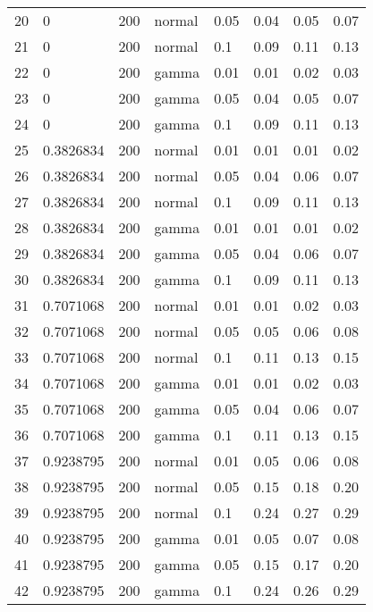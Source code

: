 \begin{table}[ht]
\begin{tabular}{rllllrrr}
  20 & 0 & 200 & normal & 0.05 & 0.04 & 0.05 & 0.07 \\ 
  21 & 0 & 200 & normal & 0.1 & 0.09 & 0.11 & 0.13 \\ 
  22 & 0 & 200 & gamma & 0.01 & 0.01 & 0.02 & 0.03 \\ 
  23 & 0 & 200 & gamma & 0.05 & 0.04 & 0.05 & 0.07 \\ 
  24 & 0 & 200 & gamma & 0.1 & 0.09 & 0.11 & 0.13 \\ 
  25 & 0.3826834 & 200 & normal & 0.01 & 0.01 & 0.01 & 0.02 \\ 
  26 & 0.3826834 & 200 & normal & 0.05 & 0.04 & 0.06 & 0.07 \\ 
  27 & 0.3826834 & 200 & normal & 0.1 & 0.09 & 0.11 & 0.13 \\ 
  28 & 0.3826834 & 200 & gamma & 0.01 & 0.01 & 0.01 & 0.02 \\ 
  29 & 0.3826834 & 200 & gamma & 0.05 & 0.04 & 0.06 & 0.07 \\ 
  30 & 0.3826834 & 200 & gamma & 0.1 & 0.09 & 0.11 & 0.13 \\ 
  31 & 0.7071068 & 200 & normal & 0.01 & 0.01 & 0.02 & 0.03 \\ 
  32 & 0.7071068 & 200 & normal & 0.05 & 0.05 & 0.06 & 0.08 \\ 
  33 & 0.7071068 & 200 & normal & 0.1 & 0.11 & 0.13 & 0.15 \\ 
  34 & 0.7071068 & 200 & gamma & 0.01 & 0.01 & 0.02 & 0.03 \\ 
  35 & 0.7071068 & 200 & gamma & 0.05 & 0.04 & 0.06 & 0.07 \\ 
  36 & 0.7071068 & 200 & gamma & 0.1 & 0.11 & 0.13 & 0.15 \\ 
  37 & 0.9238795 & 200 & normal & 0.01 & 0.05 & 0.06 & 0.08 \\ 
  38 & 0.9238795 & 200 & normal & 0.05 & 0.15 & 0.18 & 0.20 \\ 
  39 & 0.9238795 & 200 & normal & 0.1 & 0.24 & 0.27 & 0.29 \\ 
  40 & 0.9238795 & 200 & gamma & 0.01 & 0.05 & 0.07 & 0.08 \\ 
  41 & 0.9238795 & 200 & gamma & 0.05 & 0.15 & 0.17 & 0.20 \\ 
  42 & 0.9238795 & 200 & gamma & 0.1 & 0.24 & 0.26 & 0.29 \\ 
   \hline
\end{tabular}
\end{table}

